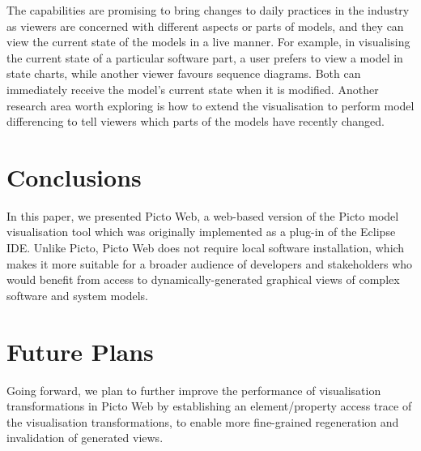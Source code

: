 \documentclass[preprint,12pt, a4paper]{elsarticle}
\begin{document}
The capabilities are promising to bring changes to daily practices in the industry as viewers are concerned with different aspects or parts of models, 
and they can view the current state of the models in a live manner. 
For example, in visualising the current state of a particular software part, 
a user prefers to view a model in state charts, 
while another viewer favours sequence diagrams. 
Both can immediately receive the model's current state when it is modified.
Another research area worth exploring is how to extend the visualisation to perform model differencing to tell viewers which parts of the models have recently changed.

%
%
%
%
%

\section{Conclusions}
In this paper, we presented Picto Web, a web-based version of the Picto model visualisation tool which was originally implemented as a plug-in of the Eclipse IDE. Unlike Picto, Picto Web does not require local software installation, which makes it more suitable for a broader audience of developers and stakeholders who would benefit from access to dynamically-generated graphical views of complex software and system models. 

\section{Future Plans}
Going forward, we plan to further improve the performance of visualisation transformations in Picto Web by establishing an element/property access trace of the visualisation transformations, to enable more fine-grained regeneration and invalidation of generated views.
\end{document}
